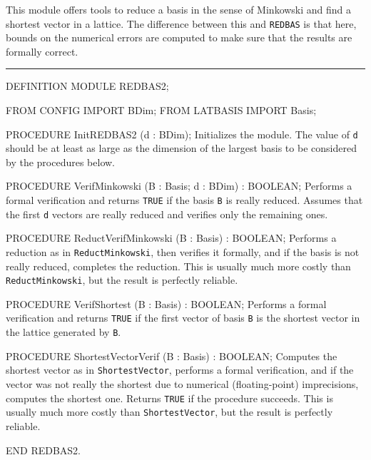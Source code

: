 
This module offers tools to reduce a basis in the
sense of Minkowski and find a shortest vector in a lattice.
The difference between this and {\tt REDBAS} is that here,
bounds on the numerical errors are computed to make sure that the
results are formally correct.

\bigskip\hrule
\code

DEFINITION MODULE REDBAS2;

FROM CONFIG   IMPORT BDim;
FROM LATBASIS IMPORT Basis;

PROCEDURE InitREDBAS2 (d : BDim);
\endcode
   \tab  Initializes the module. The value of {\tt d} should be at least
    as large as the dimension of the largest basis to be considered
    by the procedures below. \endtab
\code

PROCEDURE VerifMinkowski (B : Basis; d : BDim) : BOOLEAN;
\endcode
   \tab  Performs a formal verification and 
   returns {\tt TRUE} if the basis {\tt B} is really reduced. 
   Assumes that the first {\tt d} vectors are really reduced and
   verifies only the remaining ones. \endtab
\code

PROCEDURE ReductVerifMinkowski (B : Basis) : BOOLEAN;
\endcode
   \tab  Performs a reduction as in {\tt ReductMinkowski}, then verifies it
   formally, and if the basis is not really reduced, completes the reduction.
   This is usually much more costly than {\tt ReductMinkowski}, but the
   result is perfectly reliable. \endtab
\code

PROCEDURE VerifShortest (B : Basis) : BOOLEAN;
\endcode
   \tab  Performs a formal verification and 
   returns {\tt TRUE} if the first vector of basis {\tt B} 
   is the shortest vector in the lattice generated by {\tt B}.
   \endtab
\code

PROCEDURE ShortestVectorVerif (B : Basis) : BOOLEAN;
\endcode
   \tab  Computes the shortest vector as in {\tt ShortestVector},
   performs a formal verification, and if the vector was not really the 
   shortest due to numerical (floating-point) imprecisions, 
   computes the shortest one.
   Returns {\tt TRUE} if the procedure succeeds.
   This is usually much more costly than {\tt ShortestVector}, but the
   result is perfectly reliable.  \endtab
\code

END REDBAS2.
\endcode
